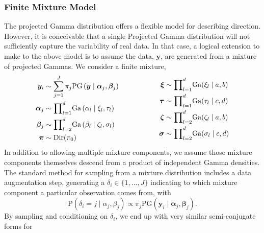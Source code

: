 \subsubsection{Finite Mixture Model}
The projected Gamma distribution offers a flexible model for describing direction.  However, it is
  conceivable that a single Projected Gamma distribution will not sufficiently capture the
  variability of real data.  In that case, a logical extension to make to the above model is to
  assume the data, $\bm{ y}$, are generated from a mixture of projected Gammas.  We consider a finite
  mixture,
  \begin{equation}
    \label{eqn:fmixp}
    \begin{aligned}
      \bm{ y}_i &\sim \sum_{j = 1}^J\pi_j\text{PG}\left(\bm{ y}\mid \bm{ \alpha}_j, \bm{ \beta}_j\right)\\
      \bm{ \alpha}_j &\sim {\small \prod}_{l = 1}^d \text{Ga}\left(\alpha_l\mid\xi_l,\tau_l\right)\\
      \bm{ \beta}_j &\sim {\small \prod}_{l = 2}^d \text{Ga}\left(\beta_l\mid\zeta_l,\sigma_l\right)\\
      \bm{ \pi} &\sim \text{Dir}(\pi_0)
    \end{aligned}
    \hspace{2cm}
    \begin{aligned}
      \bm{ \xi} &\sim {\small \prod}_{l = 1}^d \text{Ga}(\xi_l\mid a,b)\\
      \bm{ \tau} &\sim {\small \prod}_{l = 1}^d \text{Ga}(\tau_l\mid c,d)\\
      \bm{ \zeta} &\sim {\displaystyle\prod}_{l = 2}^d\text{Ga}(\zeta_l \mid a,b)\\
      \bm{ \sigma} &\sim {\displaystyle\prod}_{l = 2}^d\text{Ga}(\sigma_l\mid c,d)
    \end{aligned}
  \end{equation}
  In addition to allowing multiple mixture components, we assume those mixture components themselves
  descend from a product of independent Gamma densities. The standard method for sampling from a
  mixture distribution includes a data augmentation step, generating a
  $\delta_i \in \lbrace 1,\ldots, J\rbrace$ indicating to which mixture component a
  particular observation comes from, with
  \begin{equation*}
    \text{P}(\delta_i = j\mid\alpha_j,\beta_j) \propto \pi_j\text{PG}(\bm{ y}_i\mid \bm{ \alpha}_j,\bm{ \beta}_j).
  \end{equation*}
  By sampling and conditioning on $\delta_i$, we end up with very similar semi-conjugate forms for
